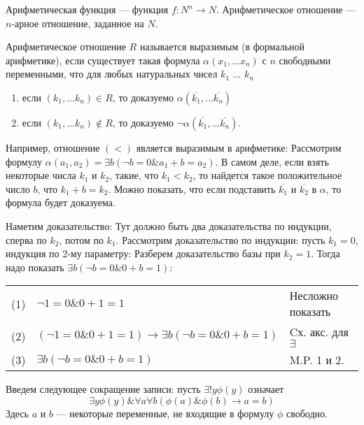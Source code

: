 \begin{definition}
Арифметическая функция --- функция $f: N^n \rightarrow N$.
Арифметическое отношение --- $n$-арное отношение, заданное на $N$.
\end{definition}

\begin{definition}
Арифметическое отношение $R$ называется выразимым (в формальной арифметике), если 
существует такая формула $\alpha (x_1, \dots x_n)$ с $n$ свободными переменными, 
что для любых натуральных чисел $k_1$ ... $k_n$
\begin{enumerate}
\item если $(k_1, \dots k_n) \in R$, то доказуемо $\alpha (\overline{k_1}, \dots \overline{k_n})$
\item если $(k_1, \dots k_n) \notin R $, то доказуемо $\neg \alpha (\overline{k_1}, \dots \overline{k_n})$.
\end{enumerate}
\end{definition}

Например, отношение $(<)$ является выразимым в арифметике:
Рассмотрим формулу $\alpha (a_1, a_2) = \exists b (\neg b = 0 \& a_1 + b = a_2)$.
В самом деле, если взять некоторые числа $k_1$ и $k_2$, такие, что $k_1 < k_2$, то найдется
такое положительное число $b$, что $k_1 + b = k_2$. Можно показать, что если подставить
$\overline{k_1}$ и $\overline{k_2}$ в $\alpha$, то формула будет доказуема. 

Наметим доказательство:
Тут должно быть два доказательства по индукции, сперва по $k_2$, потом по $k_1$.
Рассмотрим доказательство по индукции: пусть $k_1 = 0$, индукция по 2-му параметру:
Разберем доказательство базы при $k_2 = 1$. Тогда надо показать $\exists b (\neg b = 0 \& 0 + b = 1)$:

\begin{tabular}{lll}
(1) & $\neg 1 = 0 \& 0 + 1 = 1$ & Несложно показать\\
(2) & $(\neg 1 = 0 \& 0 + 1 = 1) \rightarrow \exists b (\neg b = 0 \& 0 + b = 1)$ & Cх. акс. для $\exists$\\
(3) & $\exists b (\neg b = 0 \& 0 + b = 1)$ & M.P. 1 и 2.
\end{tabular}

\begin{definition} Введем следующее сокращение записи:
пусть $\exists ! y \phi (y)$ означает $$\exists y \phi (y) \& \forall a \forall b (\phi(a) \& \phi(b) \rightarrow a=b)$$
Здесь $a$ и $b$ --- некоторые переменные, не входящие в формулу $\phi$ свободно.
\end{definition}

